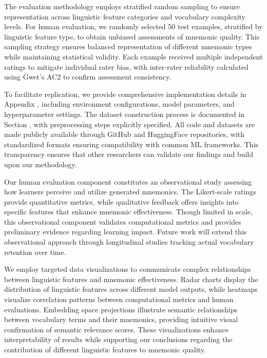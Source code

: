  The evaluation methodology employs stratified random sampling to ensure representation across linguistic feature categories and vocabulary complexity levels. For human evaluation, we randomly selected 50 test examples, stratified by linguistic feature type, to obtain unbiased assessments of mnemonic quality. This sampling strategy ensures balanced representation of different mnemonic types while maintaining statistical validity. Each example received multiple independent ratings to mitigate individual rater bias, with inter-rater reliability calculated using Gwet's AC2 to confirm assessment consistency.

 To facilitate replication, we provide comprehensive implementation details in Appendix , including environment configurations, model parameters, and hyperparameter settings. The dataset construction process is documented in Section , with preprocessing steps explicitly specified. All code and datasets are made publicly available through GitHub and HuggingFace repositories, with standardized formats ensuring compatibility with common ML frameworks. This transparency ensures that other researchers can validate our findings and build upon our methodology.

 Our human evaluation component constitutes an observational study assessing how learners perceive and utilize generated mnemonics. The Likert-scale ratings provide quantitative metrics, while qualitative feedback offers insights into specific features that enhance mnemonic effectiveness. Though limited in scale, this observational component validates computational metrics and provides preliminary evidence regarding learning impact. Future work will extend this observational approach through longitudinal studies tracking actual vocabulary retention over time.

 We employ targeted data visualizations to communicate complex relationships between linguistic features and mnemonic effectiveness. Radar charts display the distribution of linguistic features across different model outputs, while heatmaps visualize correlation patterns between computational metrics and human evaluations. Embedding space projections illustrate semantic relationships between vocabulary terms and their mnemonics, providing intuitive visual confirmation of semantic relevance scores. These visualizations enhance interpretability of results while supporting our conclusions regarding the contribution of different linguistic features to mnemonic quality.

